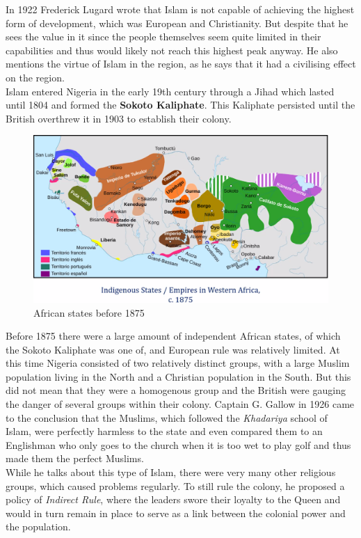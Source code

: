 \documentclass{article}
\begin{document}
	In 1922 Frederick Lugard wrote that Islam is not capable of achieving the highest form of development, which was European and Christianity. But despite that he sees the value in it since the people themselves seem quite limited in their capabilities and thus would likely not reach this highest peak anyway. He also mentions the virtue of Islam in the region, as he says that it had a civilising effect on the region. \\
	Islam entered Nigeria in the early 19th century through a Jihad which lasted until 1804 and formed the \textbf{Sokoto Kaliphate}. This Kaliphate persisted until the British overthrew it in 1903 to establish their colony. \\
	\begin{figure}
	\includegraphics{African_States.png}
	\caption{African states before 1875}
	\end{figure}
	Before 1875 there were a large amount of independent African states, of which the Sokoto Kaliphate was one of, and European rule was relatively limited. At this time Nigeria consisted of two relatively distinct groups, with a large Muslim population living in the North and a Christian population in the South. But this did not mean that they were a homogenous group and the British were gauging the danger of several groups within their colony. Captain G. Gallow in 1926 came to the conclusion that the Muslims, which followed the \textit{Khadariya} school of Islam, were perfectly harmless to the state and even compared them to an Englishman who only goes to the church when it is too wet to play golf and thus made them the perfect Muslims. \\
	While he talks about this type of Islam, there were very many other religious groups, which caused problems regularly. To still rule the colony, he proposed a policy of \textit{Indirect Rule}, where the leaders swore their loyalty to the Queen and would in turn remain in place to serve as a link between the colonial power and the population. \\
\end{document}
